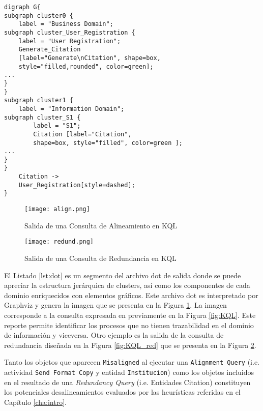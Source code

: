 \begin{lstlisting}[caption={Segment of output dot file},label=lst:dot, basicstyle=\small, tabsize=2,morekeywords={digraph, subgraph, -> }]
digraph G{
subgraph cluster0 {
	label = "Business Domain";
subgraph cluster_User_Registration {
	label = "User Registration";
	Generate_Citation
	[label="Generate\nCitation", shape=box, 
	style="filled,rounded", color=green];
...
}
}
subgraph cluster1 {
	label = "Information Domain";
subgraph cluster_S1 {
		label = "S1";
		Citation [label="Citation", 
		shape=box, style="filled", color=green ];
...
}
}		
	Citation -> 
	User_Registration[style=dashed];
}	
\end{lstlisting}

\begin{landscape}
 
\begin{figure} 
\begin{center}
	\texttt{[image: align.png]}
	\caption{Salida de una Consulta de Alineamiento en KQL}
	\label{fig:KQL_out}
\end{center}	
\end{figure}

\begin{figure} [!t]
\begin{center}
	\texttt{[image: redund.png]}
	\caption{Salida de una Consulta de Redundancia en KQL}
	\label{fig:KQL_out2}
\end{center}	
\end{figure}

\end{landscape}

El Listado \ref{lst:dot} es un segmento del archivo dot de salida donde se puede apreciar la estructura jer\'arquica de clusters, as\'i como los componentes de cada dominio enriquecidos con elementos gr\'aficos. Este archivo dot es interpretado por Graphviz y genera la imagen que se presenta en la Figura \ref{fig:KQL_out}. La imagen corresponde a la consulta expresada en previamente en la Figura \ref{fig:KQL}. Este reporte permite identificar los procesos que no tienen trazabilidad en el dominio de informaci\'on y viceversa. Otro ejemplo es la salida de la consulta de redundancia dise\~nada en la Figura \ref{fig:KQL_red} que se presenta en la Figura \ref{fig:KQL_out2}.

Tanto los objetos que aparecen \texttt{Misaligned} al ejecutar una \texttt{Alignment Query} (i.e. actividad \texttt{Send Format Copy} y entidad \texttt{Institucion}) como los objetos incluidos en el resultado de una \textit{Redundancy Query} (i.e. Entidades Citation) constituyen los potenciales desalineamientos evaluados por las heur\'isticas referidas en el Cap\'itulo \ref{cha:intro}.